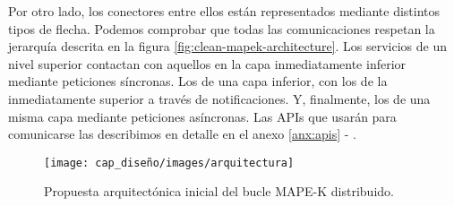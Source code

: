Por otro lado, los conectores entre ellos están representados mediante distintos tipos de flecha. Podemos comprobar que todas las comunicaciones respetan la jerarquía descrita en la figura \ref{fig:clean-mapek-architecture}. Los servicios de un nivel superior contactan con aquellos en la capa inmediatamente inferior mediante peticiones síncronas. Los de una capa inferior, con los de la inmediatamente superior a través de notificaciones. Y, finalmente, los de una misma capa mediante peticiones asíncronas. Las APIs que usarán para comunicarse las describimos en detalle en el anexo \ref{anx:apis} - .

\begin{figure}[h!]
  \hspace{-1cm}
  \texttt{[image: cap\_diseño/images/arquitectura]}
  \caption{Propuesta arquitectónica inicial del bucle MAPE-K distribuido.}
  \label{fig:arquitectura-sistema}
\end{figure}
